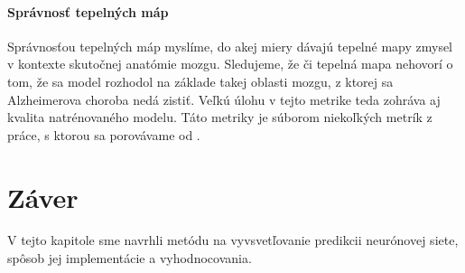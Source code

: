 \paragraph{Správnosť tepelných máp} Správnosťou tepelných máp myslíme, do akej miery dávajú tepelné mapy zmysel v kontexte skutočnej anatómie mozgu. Sledujeme, že či tepelná mapa nehovorí o tom, že sa model rozhodol na základe takej oblasti mozgu, z ktorej sa Alzheimerova choroba nedá zistiť. Veľkú úlohu v tejto metrike teda zohráva aj kvalita natrénovaného modelu. Táto metriky je súborom niekoľkých metrík z práce, s ktorou sa porovávame od \citeauthor*{bohle2019layer}.


\section{Záver}

V tejto kapitole sme navrhli metódu na vyvsvetľovanie predikcii neurónovej siete, spôsob jej implementácie a vyhodnocovania.
